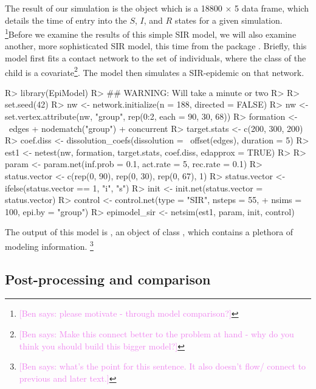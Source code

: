\documentclass[
  shortnames]{jss}
\begin{document}
The result of our simulation is the object  which is a
18800 \(\times\) 5 data frame, which details the time of entry into the
\(S\), \(I\), and \(R\) states for a given simulation.
\footnote{\textcolor{violet}{[Ben says: please motivate - through model comparison?]}}Before
we examine the results of this simple SIR model, we will also examine
another, more sophisticated SIR model, this time from the package
 \citep{Jenness2018}. Briefly, this model first fits a
contact network to the set of individuals, where the class of the child
is a
covariate\footnote{\textcolor{violet}{[Ben says: Make this connect better to the problem at hand - why do you think you should build this bigger model?]}}.
The model then simulates a SIR-epidemic on that network.

\begin{CodeChunk}
\begin{CodeInput}
R> library(EpiModel)
R> ## WARNING:  Will take a minute or two
R> 
R> set.seed(42)
R> nw <- network.initialize(n = 188, directed = FALSE)
R> nw <- set.vertex.attribute(nw, "group", rep(0:2, each = 90, 30, 68))
R> formation <- ~edges + nodematch("group") + concurrent
R> target.stats <- c(200, 300, 200)
R> coef.diss <- dissolution_coefs(dissolution = ~offset(edges),  duration = 5)
R> est1 <- netest(nw, formation, target.stats, coef.diss, edapprox = TRUE)
R> 
R> param <- param.net(inf.prob = 0.1, act.rate = 5, rec.rate = 0.1)
R> status.vector <- c(rep(0, 90), rep(0, 30), rep(0, 67), 1)
R> status.vector <- ifelse(status.vector == 1, "i", "s")
R> init <- init.net(status.vector = status.vector)
R> control <- control.net(type = "SIR", nsteps = 55,
+                        nsims = 100, epi.by = "group")
R> epimodel_sir <- netsim(est1, param, init, control)
\end{CodeInput}
\end{CodeChunk}

The output of this model is , an object of class
, which contains a plethora of modeling information.
\footnote{\textcolor{violet}{[Ben says: what's the point for this sentence. It also doesn't flow/ connect to previous and later text.]}}

\hypertarget{post-processing-and-comparison-1}{%
\subsection{Post-processing and
comparison}\label{post-processing-and-comparison-1}}
\end{document}
